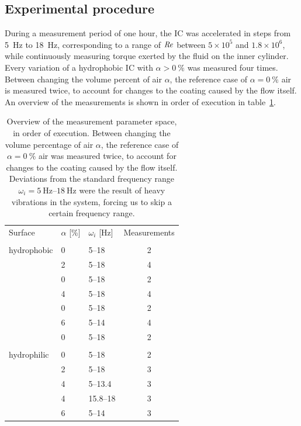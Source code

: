 \subsection{Experimental procedure}
During a measurement period of one hour, the IC was accelerated in steps from \SI{5}{\hertz} to \SI{18}{\hertz}, corresponding to a range of $\mbox{\textit{Re}}$ between $5\times10^5$ and $1.8\times10^6$, while continuously measuring torque exerted by the fluid on the inner cylinder.
Every variation of a {hydrophobic} IC with $\alpha > \SI{0}{\%}$ was measured four times. Between changing the volume percent of air $\alpha$, the reference case of $\alpha = \SI{0}{\%}$ air is measured twice, to account for changes to the coating caused by the flow itself. An overview of the measurements is shown in order of execution in table~\ref{table:measurement_order}.
\begin{table}
\centering
\begin{tabular}{ | l | l | l | c | }
\cline{1-4}  \\[-0.9em]
 Surface & $\alpha$ [\%]  & $\omega_i$ [Hz] & Measurements \\ \cline{1-4} \\[-0.9em]
hydrophobic &  0  & 	\numrange{5}{18} & 2 \\
					  &  2 	&  	5--18 & 4 \\
					  &  0 	& 		5--18 & 2 \\
					  &  4 	& 		5--18 & 4 \\
					  &  0 	& 		5--18 & 2 \\
					  &  6 	& 		5--14 & 4\\
					  &  0 	& 		5--18 & 2 \\
\cline{1-4} \\[-0.9em]
hydrophilic   & 0 	& 		5--18 & 2 \\
					  & 2 	& 		5--18 & 3\\
					  & 4 	& 		5--13.4 & 3\\
  					  & 4 	& 		15.8--18  & 3\\
					  & 6 	& 		5--14 & 3 \\ \cline{1-4}

\end{tabular}\caption{Overview of the measurement parameter space, in order of execution. Between changing the volume percentage of air $\alpha$, the reference case of $\alpha = \SI{0}{\%}$ air was measured twice, to account for changes to the coating caused by the flow itself. Deviations from the standard frequency range $\omega_i = \SIrange{5}{18}{\hertz}$ were the result of heavy vibrations in the system, forcing us to skip a certain frequency range.} \label{table:measurement_order}
\end{table}

